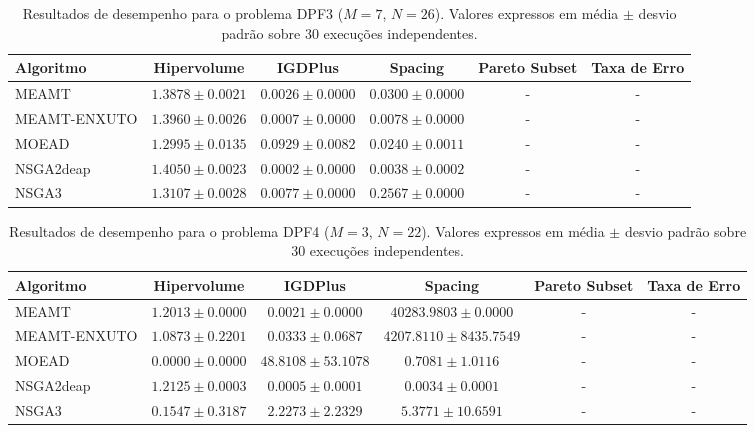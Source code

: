 \begin{table}[htpb]
\centering
\caption{Resultados de desempenho para o problema DPF3 ($M=7$, $N=26$). Valores expressos em média $\pm$ desvio padrão sobre 30 execuções independentes.}
\label{tab:DPF3_M7_N26}
\begin{tabular}{lccccc}
\hline\hline
Algoritmo & Hipervolume & IGDPlus & Spacing & Pareto Subset & Taxa de Erro \\
\hline
MEAMT & $1.3878 \pm 0.0021$ & $0.0026 \pm 0.0000$ & $0.0300 \pm 0.0000$ & - & - \\
MEAMT-ENXUTO & $1.3960 \pm 0.0026$ & $0.0007 \pm 0.0000$ & $0.0078 \pm 0.0000$ & - & - \\
MOEAD & $1.2995 \pm 0.0135$ & $0.0929 \pm 0.0082$ & $0.0240 \pm 0.0011$ & - & - \\
NSGA2deap & $1.4050 \pm 0.0023$ & $0.0002 \pm 0.0000$ & $0.0038 \pm 0.0002$ & - & - \\
NSGA3 & $1.3107 \pm 0.0028$ & $0.0077 \pm 0.0000$ & $0.2567 \pm 0.0000$ & - & - \\
\hline\hline
\end{tabular}
\end{table}

\begin{table}[htpb]
\centering
\caption{Resultados de desempenho para o problema DPF4 ($M=3$, $N=22$). Valores expressos em média $\pm$ desvio padrão sobre 30 execuções independentes.}
\label{tab:DPF4_M3_N22}
\begin{tabular}{lccccc}
\hline\hline
Algoritmo & Hipervolume & IGDPlus & Spacing & Pareto Subset & Taxa de Erro \\
\hline
MEAMT & $1.2013 \pm 0.0000$ & $0.0021 \pm 0.0000$ & $40283.9803 \pm 0.0000$ & - & - \\
MEAMT-ENXUTO & $1.0873 \pm 0.2201$ & $0.0333 \pm 0.0687$ & $4207.8110 \pm 8435.7549$ & - & - \\
MOEAD & $0.0000 \pm 0.0000$ & $48.8108 \pm 53.1078$ & $0.7081 \pm 1.0116$ & - & - \\
NSGA2deap & $1.2125 \pm 0.0003$ & $0.0005 \pm 0.0001$ & $0.0034 \pm 0.0001$ & - & - \\
NSGA3 & $0.1547 \pm 0.3187$ & $2.2273 \pm 2.2329$ & $5.3771 \pm 10.6591$ & - & - \\
\hline\hline
\end{tabular}
\end{table}

